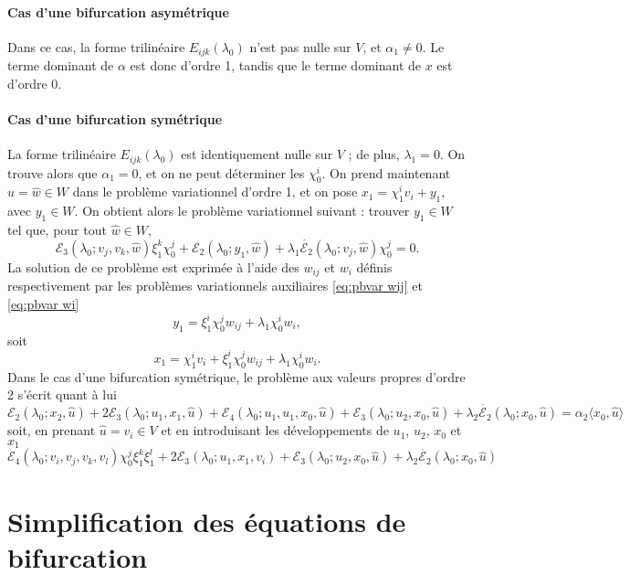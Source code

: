 \documentclass{article}
\begin{document}
\paragraph{Cas d'une bifurcation asymétrique}Dans ce cas, la forme
trilinéaire $E_{i  j  k} (\lambda_0)$ n'est pas nulle sur
$V$, et $\alpha_1 \neq 0$. Le terme dominant de $\alpha$ est donc d'ordre 1,
tandis que le terme dominant de $x$ est d'ordre 0.

\paragraph{Cas d'une bifurcation symétrique}La forme trilinéaire $E_{i
 j  k} (\lambda_0)$ est identiquement nulle sur $V$ ; de plus,
$\lambda_1 = 0$. On trouve alors que $\alpha_1 = 0$, et on ne peut
déterminer les $\chi_0^i$. On prend maintenant $\hat{u} = \hat{w} \in W$
dans le problème variationnel d'ordre 1, et on pose $x_1 = \chi_1^i v_i +
y_1$, avec $y_1 \in W$. On obtient alors le problème variationnel suivant
: trouver $y_1 \in W$ tel que, pour tout $\hat{w} \in W$,
\[ \mathcal{E}_3 (\lambda_0 ; v_j, v_k, \hat{w}) \xi_1^k \chi_0^j
   +\mathcal{E}_2 (\lambda_0 ; y_1, \hat{w}) + \lambda_1  \dot{\mathcal{E}_2}
   (\lambda_0 ; v_j, \hat{w}) \chi_0^j = 0. \]
La solution de ce problème est exprimée à l'aide des $w_{i
 j}$ et $w_i$ définis respectivement par les problèmes
variationnels auxiliaires \eqref{eq:pbvar wij} et \eqref{eq:pbvar wi}
\[ y_1 = \xi_1^i \chi_0^j w_{i  j} + \lambda_1 \chi_0^i w_i, \]
soit
\[ x_1 = \chi_1^i v_i + \xi_1^i \chi_0^j w_{i  j} + \lambda_1 \chi_0^i
   w_i . \]
Dans le cas d'une bifurcation symétrique, le problème aux valeurs
propres d'ordre 2 s'écrit quant à lui
\[ \mathcal{E}_2 (\lambda_0 ; x_2, \hat{u}) + 2\mathcal{E}_3 (\lambda_0 ; u_1,
   x_1, \hat{u}) +\mathcal{E}_4  (\lambda_0 ; u_1, u_1, x_0, \hat{u})
   +\mathcal{E}_3 (\lambda_0 ; u_2, x_0, \hat{u}) + \lambda_2
   \dot{\mathcal{E}_2} (\lambda_0 ; x_0, \hat{u}) = \alpha_2  \langle x_0,
   \hat{u} \rangle \]
soit, en prenant $\hat{u} = \widehat{v_i} \in V$ et en introduisant les
développements de $u_1$, $u_2$, $x_0 $ et $x_1$
\[ \mathcal{E}_4  (\lambda_0 ; v_i, v_j, v_k, v_l) \chi_0^j \xi_{1 }^k \xi_1^l
   + 2\mathcal{E}_3 (\lambda_0 ; u_1, x_1, v_i) +\mathcal{E}_3 (\lambda_0 ;
   u_2, x_0, \hat{u}) + \lambda_2  \dot{\mathcal{E}_2} (\lambda_0 ; x_0,
   \hat{u}) \]
\section{Simplification des équations de
bifurcation}\label{sec:Simplification des équations de bifurcation}
\end{document}
